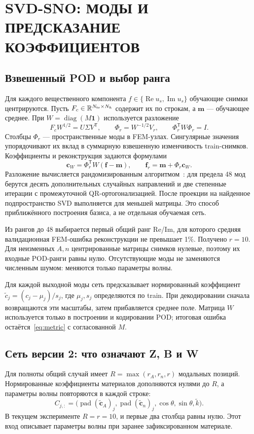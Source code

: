 \documentclass[notitle]{sibjima_preview}
\newcommand{\R}{\mathbb{R}}
\newcommand{\trans}{\mathsf{T}}
\begin{document}
\section{SVD-SNO: МОДЫ И ПРЕДСКАЗАНИЕ КОЭФФИЦИЕНТОВ}
\subsection{Взвешенный POD и выбор ранга}
Для каждого вещественного компонента \(f\in\{\operatorname{Re}u_s,\operatorname{Im}u_s\}\) обучающие снимки центрируются. Пусть \(F_c\in\R^{N_{\rm tr}\times N_h}\) содержит их по строкам, а \(\bm m\) --- обучающее среднее. При \(W=\operatorname{diag}(M\bm1)\) используется разложение
\begin{equation}
F_cW^{1/2}=U\Sigma V^\trans,\qquad
\Phi_r=W^{-1/2}V_r,\qquad \Phi_r^\trans W\Phi_r=I.
\label{eq:pod}
\end{equation}
Столбцы \(\Phi_r\) --- пространственные моды в FEM-узлах. Сингулярные значения упорядочивают их вклад в суммарную взвешенную изменчивость train-снимков. Коэффициенты и реконструкция задаются формулами
\begin{equation}
\bm c_W=\Phi_r^\trans W(\bm f-\bm m),\qquad
\bm f_r=\bm m+\Phi_r\bm c_W.
\label{eq:pod_encode}
\end{equation}
Разложение вычисляется рандомизированным алгоритмом~\cite{halko2011}: для предела 48 мод берутся десять дополнительных случайных направлений и две степенные итерации с промежуточной QR-ортогонализацией. После проекции на найденное подпространство SVD выполняется для меньшей матрицы. Это способ приближённого построения базиса, а не отдельная обучаемая сеть.

Из рангов до 48 выбирается первый общий ранг Re/Im, для которого средняя валидационная FEM-ошибка реконструкции не превышает 1\%. Получено \(r=10\). Для неизменных \(A,n\) центрированные матрицы снимков нулевые, поэтому их входные POD-ранги равны нулю. Отсутствующие моды не заменяются численным шумом: меняются только параметры волны.

Для каждой выходной моды сеть предсказывает нормированный коэффициент
\(\widetilde c_j=(c_j-\mu_j)/s_j\), где \(\mu_j,s_j\) определяются по train. При декодировании сначала возвращаются эти масштабы, затем прибавляется среднее поле. Матрица \(W\) используется только в построении и кодировании POD; итоговая ошибка остаётся~\eqref{eq:metric} с согласованной \(M\).

\subsection{Сеть версии 2: что означают Z, B и W}
Для полноты общий случай имеет \(R=\max(r_A,r_n,r)\) модальных позиций. Нормированные коэффициенты материалов дополняются нулями до \(R\), а параметры волны повторяются в каждой строке:
\begin{equation}
C_{j,:}=\bigl(\operatorname{pad}(\widetilde{\bm c}_A)_j,
\operatorname{pad}(\widetilde{\bm c}_n)_j,\cos\theta,\sin\theta,\widetilde k\bigr).
\label{eq:tokens}
\end{equation}
В текущем эксперименте \(R=r=10\), и первые два столбца равны нулю. Этот вход описывает параметры волны при заранее зафиксированном материале.
\end{document}
